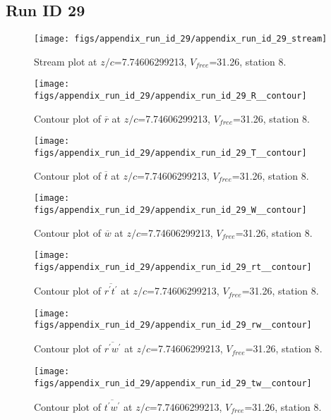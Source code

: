 \subsection{Run ID 29}
\begin{figure}[H]
\centering
\texttt{[image: figs/appendix\_run\_id\_29/appendix\_run\_id\_29\_stream]}
\caption{Stream plot at $z/c$=7.74606299213, $V_{free}$=31.26, station 8.}
\label{fig:appendix_run_id_29_stream}
\end{figure}


\begin{figure}[H]
\centering
\texttt{[image: figs/appendix\_run\_id\_29/appendix\_run\_id\_29\_R\_\_contour]}
\caption{Contour plot of $\overline{r}$ at $z/c$=7.74606299213, $V_{free}$=31.26, station 8.}
\label{fig:appendix_run_id_29_R__contour}
\end{figure}


\begin{figure}[H]
\centering
\texttt{[image: figs/appendix\_run\_id\_29/appendix\_run\_id\_29\_T\_\_contour]}
\caption{Contour plot of $\overline{t}$ at $z/c$=7.74606299213, $V_{free}$=31.26, station 8.}
\label{fig:appendix_run_id_29_T__contour}
\end{figure}


\begin{figure}[H]
\centering
\texttt{[image: figs/appendix\_run\_id\_29/appendix\_run\_id\_29\_W\_\_contour]}
\caption{Contour plot of $\overline{w}$ at $z/c$=7.74606299213, $V_{free}$=31.26, station 8.}
\label{fig:appendix_run_id_29_W__contour}
\end{figure}


\begin{figure}[H]
\centering
\texttt{[image: figs/appendix\_run\_id\_29/appendix\_run\_id\_29\_rt\_\_contour]}
\caption{Contour plot of $\overline{r^\prime t^\prime}$ at $z/c$=7.74606299213, $V_{free}$=31.26, station 8.}
\label{fig:appendix_run_id_29_rt__contour}
\end{figure}


\begin{figure}[H]
\centering
\texttt{[image: figs/appendix\_run\_id\_29/appendix\_run\_id\_29\_rw\_\_contour]}
\caption{Contour plot of $\overline{r^\prime w^\prime}$ at $z/c$=7.74606299213, $V_{free}$=31.26, station 8.}
\label{fig:appendix_run_id_29_rw__contour}
\end{figure}


\begin{figure}[H]
\centering
\texttt{[image: figs/appendix\_run\_id\_29/appendix\_run\_id\_29\_tw\_\_contour]}
\caption{Contour plot of $\overline{t^\prime w^\prime}$ at $z/c$=7.74606299213, $V_{free}$=31.26, station 8.}
\label{fig:appendix_run_id_29_tw__contour}
\end{figure}


